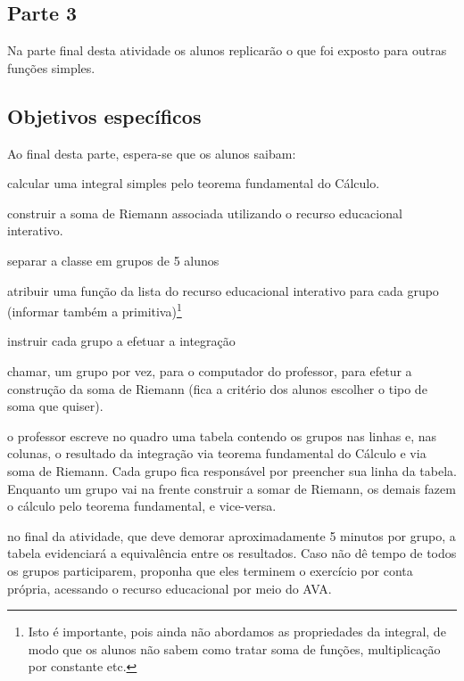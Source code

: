\documentclass[a4paper,12pt]{scrartcl}
\begin{document}
    \subsection*{Parte 3}
    
      Na parte final desta atividade os alunos replicarão o que foi exposto para outras funções simples.
    
    \subsection*{Objetivos específicos}
  
      Ao final desta parte, espera-se que os alunos saibam:
      \begin{compactitem}
	\item calcular uma integral simples pelo teorema fundamental do Cálculo.
	\item construir a soma de Riemann associada utilizando o recurso educacional interativo.
      \end{compactitem}
      
      \begin{list}{.}{
	\setlength\leftmargin{0cm}%
	\setlength\itemindent\parindent%
	\setlength\listparindent{\parindent}%
        \setlength{}%
        \setlength{}%
      }
      
	\item separar a classe em grupos de 5 alunos
	\item atribuir uma função da lista do recurso educacional interativo para cada grupo (informar também a primitiva)\footnote{Isto é importante, pois
	ainda não abordamos as propriedades da integral, de modo que os alunos não sabem como tratar soma de funções, multiplicação por constante etc.}
	\item instruir cada grupo a efetuar a integração
	\item chamar, um grupo por vez, para o computador do professor, para efetur a construção da soma de Riemann (fica a critério dos alunos escolher o
	tipo de soma que quiser).
	\item o professor escreve no quadro uma tabela contendo os grupos nas linhas e, nas colunas, o resultado da integração via teorema fundamental do
	Cálculo e via soma de Riemann. Cada grupo fica responsável por preencher sua linha da tabela. Enquanto um grupo vai na frente construir a somar
	de Riemann, os demais fazem o cálculo pelo teorema fundamental, e vice-versa.
	\item no final da atividade, que deve demorar aproximadamente 5 minutos por grupo, a tabela evidenciará a equivalência entre os resultados.
	Caso não dê tempo de todos os grupos participarem, proponha que eles terminem o exercício por conta própria, acessando o recurso educacional 
	por meio do AVA.
      
      \end{list}
    
\end{document}
